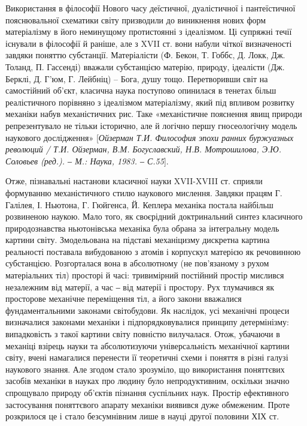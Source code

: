 Використання в філософії Нового часу деїстичної, дуалістичної і
пантеїстичної пояснювальної схематики світу призводили до виникнення нових
форм матеріалізму в його неминущому протистоянні з ідеалізмом. Ці супряжні
течії існували в філософії й раніше, але з XVII ст. вони набули чіткої
визначеності завдяки поняттю субстанції. Матеріалісти (Ф. Бекон, Т. Гоббс, Д.
Локк, Дж. Толанд, П. Гассенді) вважали субстанцією матерію, природу,
ідеалісти (Дж. Берклі, Д. Г’юм, Г. Лейбніц) – Бога, душу тощо. Перетворивши
світ на самостійний об’єкт, класична наука поступово опинилася в тенетах
більш реалістичного порівняно з ідеалізмом матеріалізму, який під впливом
розвитку механіки набув механістичних рис. Таке «механістичне пояснення
явищ природи репрезентувало не тільки історично, але й логічно першу
гносеологічну модель наукового дослідження» [\textit{Ойзерман Т.И. Философия
эпохи ранних буржуазных революций / Т.И. Ойзерман, В.М. Богуславский, Н.В.
Мотрошилова, Э.Ю. Соловьев (ред.). ‒ М.: Наука, 1983. ‒ С.55}].

Отже, пізнавальні настанови класичної науки XVII-XVIII ст. сприяли
формуванню механістичного стилю наукового мислення. Завдяки працям Г.
Галілея, І. Ньютона, Г. Гюйгенса, Й. Кеплера механіка постала найбільш
розвиненою наукою. Мало того, як своєрідний доктринальний синтез
класичного природознавства ньютонівська механіка була обрана за інтегральну
модель картини світу. Змодельована на підставі механіцизму дискретна картина
реальності поставала вибудованою з атомів і корпускул матерією як
речовинною субстанцією. Розгорталася вона в абсолютному (не пов’язаному з
рухом матеріальних тіл) просторі й часі: тривимірний постійний простір
мислився незалежним від матерії, а час ‒ від матерії і простору. Рух тлумачився
як просторове механічне переміщення тіл, а його закони вважалися
фундаментальними законами світобудови. Як наслідок, усі механічні процеси
визначалися законами механіки і підпорядковувалися принципу детермінізму:
випадковість з такої картини світу повністю вилучалася. Отож, убачаючи в
механіці взірець науки та абсолютизуючи універсальність механічної картини
світу, вчені намагалися перенести її теоретичні схеми і поняття в різні галузі
наукового знання. Але згодом стало зрозуміло, що використання поняттєвих
засобів механіки в науках про людину було непродуктивним, оскільки значно
спрощувало природу об’єктів пізнання суспільних наук. Простір ефективного
застосування поняттєвого апарату механіки виявився дуже обмеженим. Проте
розкрилося це і стало безсумнівним лише в науці другої половини ХІХ ст.

